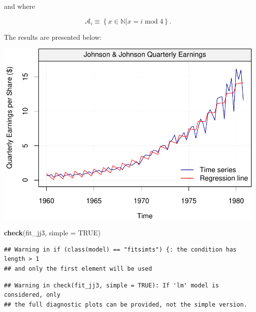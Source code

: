 \documentclass[]{book}
\newenvironment{Shaded}{\begin{snugshade}}{\end{snugshade}}
\newcommand{\DataTypeTok}[1]{\textcolor[rgb]{0.13,0.29,0.53}{#1}}
\newcommand{\KeywordTok}[1]{\textcolor[rgb]{0.13,0.29,0.53}{\textbf{#1}}}
\newcommand{\NormalTok}[1]{#1}
\newcommand{\OtherTok}[1]{\textcolor[rgb]{0.56,0.35,0.01}{#1}}
\theoremstyle{definition}
\theoremstyle{definition}
\theoremstyle{definition}
\theoremstyle{remark}
\begin{document}
and where

\[
\mathcal{A}_i \equiv \left\{x \in \mathbb{N} | x = i \; \text{mod} \;  4\right\}.
\]

The results are presented below:

\begin{center}\includegraphics{ts_files/figure-latex/unnamed-chunk-17-1} \end{center}

\begin{Shaded}
\begin{Highlighting}[]
\KeywordTok{check}\NormalTok{(fit_jj3, }\DataTypeTok{simple =} \OtherTok{TRUE}\NormalTok{)}
\end{Highlighting}
\end{Shaded}

\begin{verbatim}
## Warning in if (class(model) == "fitsimts") {: the condition has length > 1
## and only the first element will be used
\end{verbatim}

\begin{verbatim}
## Warning in check(fit_jj3, simple = TRUE): If 'lm' model is considered, only
## the full diagnostic plots can be provided, not the simple version.
\end{verbatim}
\end{document}
